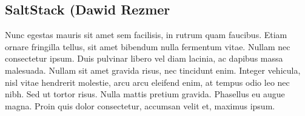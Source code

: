 \subsection{SaltStack (Dawid Rezmer}
Nunc egestas mauris sit amet sem facilisis, in rutrum quam faucibus. Etiam ornare fringilla tellus, sit amet bibendum nulla fermentum vitae. Nullam nec consectetur ipsum. Duis pulvinar libero vel diam lacinia, ac dapibus massa malesuada. Nullam sit amet gravida risus, nec tincidunt enim. Integer vehicula, nisl vitae hendrerit molestie, arcu arcu eleifend enim, at tempus odio leo nec nibh. Sed ut tortor risus. Nulla mattis pretium gravida. Phasellus eu augue magna. Proin quis dolor consectetur, accumsan velit et, maximus ipsum. 